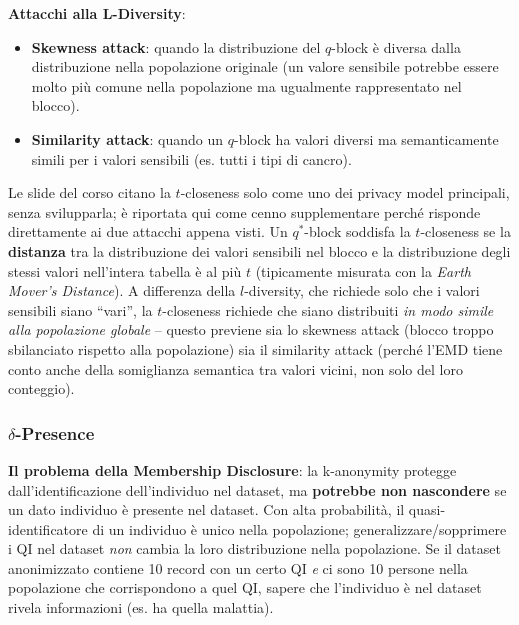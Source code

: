 \documentclass[a4paper,11pt]{article}
\begin{document}
\textbf{Attacchi alla L-Diversity}:
\begin{itemize}
  \item \textbf{Skewness attack}: quando la distribuzione del $q$-block \`{e} diversa dalla distribuzione nella popolazione originale (un valore sensibile potrebbe essere molto pi\`{u} comune nella popolazione ma ugualmente rappresentato nel blocco).
  \item \textbf{Similarity attack}: quando un $q$-block ha valori diversi ma semanticamente simili per i valori sensibili (es. tutti i tipi di cancro).
\end{itemize}

\begin{nota}
Le slide del corso citano la $t$-closeness solo come uno dei privacy model principali, senza svilupparla; \`{e} riportata qui come cenno supplementare perch\'{e} risponde direttamente ai due attacchi appena visti. Un $q^*$-block soddisfa la $t$-closeness se la \textbf{distanza} tra la distribuzione dei valori sensibili nel blocco e la distribuzione degli stessi valori nell'intera tabella \`{e} al pi\`{u} $t$ (tipicamente misurata con la \emph{Earth Mover's Distance}). A differenza della $l$-diversity, che richiede solo che i valori sensibili siano ``vari'', la $t$-closeness richiede che siano distribuiti \emph{in modo simile alla popolazione globale} -- questo previene sia lo skewness attack (blocco troppo sbilanciato rispetto alla popolazione) sia il similarity attack (perch\'{e} l'EMD tiene conto anche della somiglianza semantica tra valori vicini, non solo del loro conteggio).
\end{nota}

\subsubsection{$\delta$-Presence}

\textbf{Il problema della Membership Disclosure}: la k-anonymity protegge dall'identificazione dell'individuo nel dataset, ma \textbf{potrebbe non nascondere} se un dato individuo \`{e} presente nel dataset. Con alta probabilit\`{a}, il quasi-identificatore di un individuo \`{e} unico nella popolazione; generalizzare/sopprimere i QI nel dataset \emph{non} cambia la loro distribuzione nella popolazione. Se il dataset anonimizzato contiene 10 record con un certo QI \emph{e} ci sono 10 persone nella popolazione che corrispondono a quel QI, sapere che l'individuo \`{e} nel dataset rivela informazioni (es. ha quella malattia).
\end{document}
